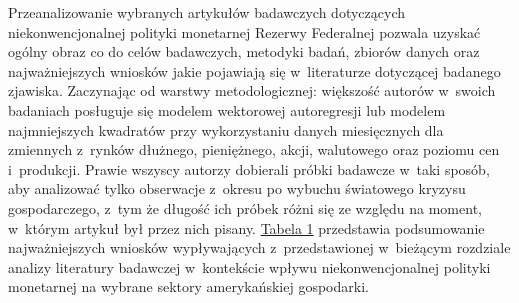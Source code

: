 Przeanalizowanie wybranych artykułów badawczych dotyczących niekonwencjonalnej polityki monetarnej Rezerwy Federalnej pozwala uzyskać ogólny obraz co do celów badawczych, metodyki badań, zbiorów danych oraz najważniejszych wniosków jakie pojawiają się w~literaturze dotyczącej badanego zjawiska. Zaczynając od warstwy metodologicznej: większość autorów w~swoich badaniach posługuje się modelem wektorowej autoregresji lub modelem najmniejszych kwadratów przy wykorzystaniu danych miesięcznych dla zmiennych z~rynków dłużnego, pieniężnego, akcji, walutowego oraz poziomu cen i~produkcji. Prawie wszyscy autorzy dobierali próbki badawcze w~taki sposób, aby analizować tylko obserwacje z~okresu po wybuchu światowego kryzysu gospodarczego, z~tym że długość ich próbek różni się ze względu na moment, w~którym artykuł był przez nich pisany. \hyperlink{tab0}{Tabela 1} przedstawia podsumowanie najważniejszych wniosków wypływających z~przedstawionej w~bieżącym rozdziale analizy literatury badawczej w~kontekście wpływu niekonwencjonalnej polityki monetarnej na wybrane sektory amerykańskiej gospodarki.


